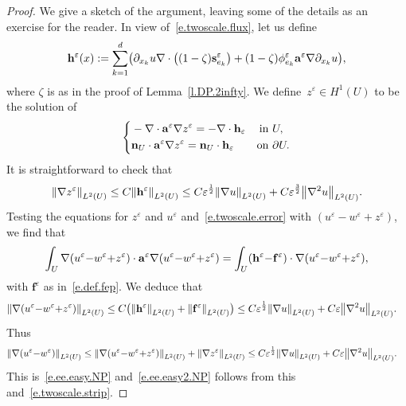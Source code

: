 \documentclass[11pt]{article} %
\numberwithin{equation}{section}
\theoremstyle{definition}
\let\originalleft\left
\let\originalright\right
\renewcommand{\left}{\mathopen{}\mathclose\bgroup\originalleft}
\renewcommand{\right}{\aftergroup\egroup\originalright}
\newcommand{\eps}{\varepsilon}
\newcommand{\f}{\mathbf{f}}
\newcommand{\s}{\mathbf{s}}
\newcommand{\ep}{\eps}
\renewcommand{\a}{\mathbf{a}}
\begin{document}
\begin{proof}
We give a sketch of the argument, leaving some of the details as an exercise for the reader.
In view of~\eqref{e.twoscale.flux}, let us define 
\begin{equation}
\mathbf{h}^\ep (x)
:= 
\sum_{k=1}^d 
\left( 
\partial_{x_k} u  \nabla \cdot \left( (1-\zeta) \s^\ep_{e_k} \right)
+
 (1-\zeta)\phi^\ep_{e_k} \a^\ep \nabla \partial_{x_k} u 
\right),
\end{equation}
where $\zeta$ is as in the proof of Lemma~\ref{l.DP.2infty}. 
We define~$z^\ep\in H^1(U)$ to be the solution of 
\begin{align*}
\left\{
\begin{aligned}
& -\nabla \cdot \a^\ep \nabla z^\ep = - \nabla \cdot \mathbf{h}_\ep
& \mbox{in} & \ U,  \\
& \mathbf{n}_{U} \cdot \a^\ep \nabla z^\ep = \mathbf{n}_{U} \cdot \mathbf{h}_\ep 
& \mbox{on} & \ \partial U. 
\end{aligned}
\right. 
\end{align*}
It is straightforward to check that 
\begin{equation}
\left\| \nabla z^\ep \right\|_{L^2(U)}
\leq 
C\left\| \mathbf{h}^\ep \right\|_{L^2(U)}
\leq
C \ep^{\frac12} \left\| \nabla u \right\|_{L^2(U)}
+
C \ep^{\frac32} \left\| \nabla^2 u \right\|_{L^2(U)}.
\end{equation}
Testing the equations for $z^\ep$ and $u^\ep$ and~\eqref{e.twoscale.error} with $ (u^\ep {-} w^\ep {+} z^\ep) $, we find that 
\begin{equation}
\int_U 
\nabla (u^\ep {-} w^\ep {+} z^\ep) 
\cdot \a^\ep 
\nabla (u^\ep {-} w^\ep {+} z^\ep)
=
\int_U 
\left(\mathbf{h}^\ep {-} \f^\ep \right)
\cdot
\nabla (u^\ep {-} w^\ep {+} z^\ep),
\end{equation}
with $\f^\ep$ as in~\eqref{e.def.fep}. We deduce that 
\begin{align*}
\left\| 
\nabla (u^\ep {-} w^\ep {+} z^\ep)
\right\|_{L^2(U)}
& 
\leq 
C \bigl( 
\left\| \mathbf{h}^\ep \right\|_{L^2(U)}
+\left\| \f^\ep \right\|_{L^2(U)}
\bigr)
\leq
C \ep^{\frac12} \left\| \nabla u \right\|_{L^2(U)}
+
C \ep \left\| \nabla^2 u \right\|_{L^2(U)}.
\end{align*}
Thus 
\begin{align*}
\left\| 
\nabla (u^\ep {-} w^\ep)
\right\|_{L^2(U)}
&
\leq
\left\| 
\nabla (u^\ep {-} w^\ep {+} z^\ep)
\right\|_{L^2(U)}
+
\left\| 
\nabla z^\ep
\right\|_{L^2(U)}
\leq 
C \ep^{\frac12} \left\| \nabla u \right\|_{L^2(U)}
+
C \ep \left\| \nabla^2 u \right\|_{L^2(U)}.
\end{align*}
This is~\eqref{e.ee.easy.NP} and~\eqref{e.ee.easy2.NP} follows from this and~\eqref{e.twoscale.strip}. 
\end{proof}
\end{document}
